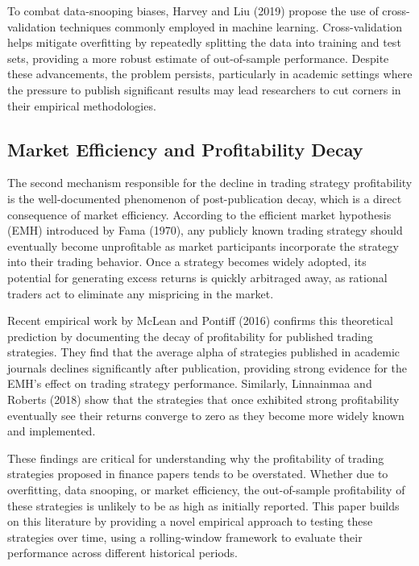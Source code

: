 To combat data-snooping biases, Harvey and Liu (2019) propose the use of cross-validation techniques commonly employed in machine learning. Cross-validation helps mitigate overfitting by repeatedly splitting the data into training and test sets, providing a more robust estimate of out-of-sample performance. Despite these advancements, the problem persists, particularly in academic settings where the pressure to publish significant results may lead researchers to cut corners in their empirical methodologies.

\subsection{Market Efficiency and Profitability Decay}

The second mechanism responsible for the decline in trading strategy profitability is the well-documented phenomenon of post-publication decay, which is a direct consequence of market efficiency. According to the efficient market hypothesis (EMH) introduced by Fama (1970), any publicly known trading strategy should eventually become unprofitable as market participants incorporate the strategy into their trading behavior. Once a strategy becomes widely adopted, its potential for generating excess returns is quickly arbitraged away, as rational traders act to eliminate any mispricing in the market.

Recent empirical work by McLean and Pontiff (2016) confirms this theoretical prediction by documenting the decay of profitability for published trading strategies. They find that the average alpha of strategies published in academic journals declines significantly after publication, providing strong evidence for the EMH's effect on trading strategy performance. Similarly, Linnainmaa and Roberts (2018) show that the strategies that once exhibited strong profitability eventually see their returns converge to zero as they become more widely known and implemented.

These findings are critical for understanding why the profitability of trading strategies proposed in finance papers tends to be overstated. Whether due to overfitting, data snooping, or market efficiency, the out-of-sample profitability of these strategies is unlikely to be as high as initially reported. This paper builds on this literature by providing a novel empirical approach to testing these strategies over time, using a rolling-window framework to evaluate their performance across different historical periods.
